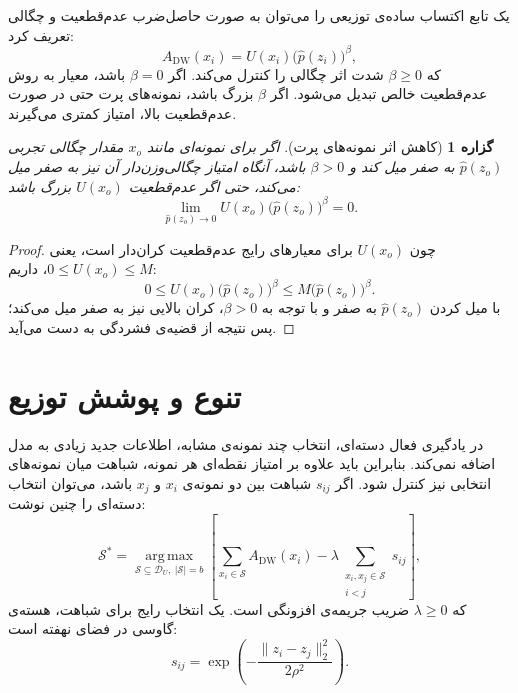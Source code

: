 \documentclass[12pt,a4paper,oneside]{report}
\newtheorem{proposition}{گزاره}[chapter]
\newcommand{\cD}{\mathcal{D}}
\newcommand{\cS}{\mathcal{S}}
\newcommand{\argmax}{\operatorname*{arg\,max}}
\begin{document}
یک تابع اکتساب ساده‌ی توزیعی را می‌توان به صورت حاصل‌ضرب عدم‌قطعیت و چگالی تعریف کرد:
\begin{equation}
A_{\mathrm{DW}}(x_i)=U(x_i)\big(\widehat p(z_i)\big)^\beta,
\label{eq:density_weighted}
\end{equation}
که $\beta\geq 0$ شدت اثر چگالی را کنترل می‌کند. اگر $\beta=0$ باشد، معیار به روش عدم‌قطعیت خالص تبدیل می‌شود. اگر $\beta$ بزرگ باشد، نمونه‌های پرت حتی در صورت عدم‌قطعیت بالا، امتیاز کمتری می‌گیرند.

\begin{proposition}[کاهش اثر نمونه‌های پرت]
اگر برای نمونه‌ای مانند $x_o$ مقدار چگالی تجربی $\widehat p(z_o)$ به صفر میل کند و $\beta>0$ باشد، آنگاه امتیاز چگالی‌وزن‌دار آن نیز به صفر میل می‌کند، حتی اگر عدم‌قطعیت $U(x_o)$ بزرگ باشد:
\begin{equation}
\lim_{\widehat p(z_o)\to 0} U(x_o)\big(\widehat p(z_o)\big)^\beta=0.
\end{equation}
\end{proposition}

\begin{proof}
چون $U(x_o)$ برای معیارهای رایج عدم‌قطعیت کران‌دار است، یعنی $0\leq U(x_o)\leq M$، داریم:
\begin{equation}
0\leq U(x_o)\big(\widehat p(z_o)\big)^\beta
\leq M\big(\widehat p(z_o)\big)^\beta.
\end{equation}
با میل کردن $\widehat p(z_o)$ به صفر و با توجه به $\beta>0$، کران بالایی نیز به صفر میل می‌کند؛ پس نتیجه از قضیه‌ی فشردگی به دست می‌آید.
\end{proof}

\section{تنوع و پوشش توزیع}
\label{sec:dal_diversity}

در یادگیری فعال دسته‌ای، انتخاب چند نمونه‌ی مشابه، اطلاعات جدید زیادی به مدل اضافه نمی‌کند. بنابراین باید علاوه بر امتیاز نقطه‌ای هر نمونه، شباهت میان نمونه‌های انتخابی نیز کنترل شود. اگر $s_{ij}$ شباهت بین دو نمونه‌ی $x_i$ و $x_j$ باشد، می‌توان انتخاب دسته‌ای را چنین نوشت:
\begin{equation}
\cS^*=\argmax_{\cS\subseteq \cD_U,\ |\cS|=b}
\left[
\sum_{x_i\in\cS} A_{\mathrm{DW}}(x_i)
-\lambda\sum_{\substack{x_i,x_j\in\cS\\ i<j}}s_{ij}
\right],
\label{eq:diverse_batch}
\end{equation}
که $\lambda\geq 0$ ضریب جریمه‌ی افزونگی است. یک انتخاب رایج برای شباهت، هسته‌ی گاوسی در فضای نهفته است:
\begin{equation}
s_{ij}=\exp\left(-\frac{\|z_i-z_j\|_2^2}{2\rho^2}\right).
\end{equation}
\end{document}
